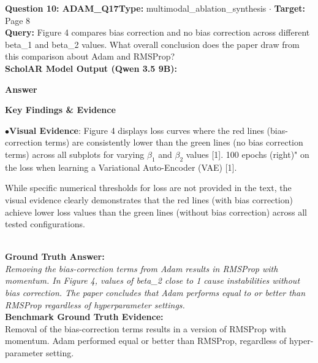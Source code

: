 \documentclass[10pt,a4paper]{article}
\begin{document}
\begin{tcolorbox}[questionbox]
{\noindent\bfseries\large\color{navy} Question 10: ADAM\_Q17}\hfill {\footnotesize\color{darkteal}\textbf{Type:} multimodal\_ablation\_synthesis $\cdot$ \textbf{Target:} Page 8}\\[4pt]
{\noindent\bfseries\color{accentblue} Query: } Figure 4 compares bias correction and no bias correction across different beta\_1 and beta\_2 values. What overall conclusion does the paper draw from this comparison about Adam and RMSProp?\\[6pt]
{\noindent\bfseries\color{navy} ScholAR Model Output (Qwen 3.5 9B):}\\[2pt]
{\small \noindent \textbf{Answer}\par\vspace{3pt}\noindent \textbf{Key Findings \& Evidence}\par\vspace{3pt}\noindent\hspace*{8pt}$\bullet$\hspace*{4pt}\textbf{Visual Evidence}: Figure 4 displays loss curves where the red lines (bias-correction terms) are consistently lower than the green lines (no bias correction terms) across all subplots for varying $\beta_1$ and $\beta_2$ values [1]. 100 epochs (right)" on the loss when learning a Variational Auto-Encoder (VAE) [1].\par\vspace{3pt}While specific numerical thresholds for loss are not provided in the text, the visual evidence clearly demonstrates that the red lines (with bias correction) achieve lower loss values than the green lines (without bias correction) across all tested configurations.}\\[6pt]
{\noindent\bfseries\color{darkteal} Ground Truth Answer:}\\[2pt]
{\small\itshape Removing the bias-correction terms from Adam results in RMSProp with momentum. In Figure 4, values of beta\_2 close to 1 cause instabilities without bias correction. The paper concludes that Adam performs equal to or better than RMSProp regardless of hyperparameter settings.}\\[4pt]
{\noindent\bfseries\color{darkteal} Benchmark Ground Truth Evidence:}\\[2pt]
{\footnotesize Removal of the bias-correction terms results in a version of RMSProp with momentum. Adam performed equal or better than RMSProp, regardless of hyper-parameter setting.}\\[4pt]

\end{tcolorbox}
\end{document}
